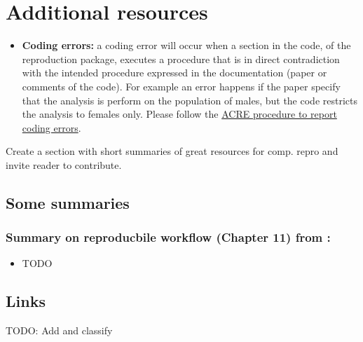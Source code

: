 \documentclass[]{book}
\providecommand{\tightlist}{%
  \setlength{\itemsep}{0pt}\setlength{\parskip}{0pt}}
\begin{document}
\hypertarget{additional-resources-1}{%
\chapter{Additional resources}\label{additional-resources-1}}

\begin{itemize}
\tightlist
\item
  \textbf{Coding errors:} a coding error will occur when a section in the code, of the reproduction package, executes a procedure that is in direct contradiction with the intended procedure expressed in the documentation (paper or comments of the code). For example an error happens if the paper specify that the analysis is perform on the population of males, but the code restricts the analysis to females only. Please follow the \href{ADD\%20LINK}{ACRE procedure to report coding errors}.
\end{itemize}

Create a section with short summaries of great resources for comp. repro and invite reader to contribute.

\hypertarget{some-summaries-1}{%
\section{Some summaries}\label{some-summaries-1}}

\hypertarget{summary-on-reproducbile-workflow-chapter-11-from-christensen2019transparent-1}{%
\subsection{\texorpdfstring{Summary on reproducbile workflow (Chapter 11) from \citet{christensen2019transparent}:}{Summary on reproducbile workflow (Chapter 11) from @christensen2019transparent:}}\label{summary-on-reproducbile-workflow-chapter-11-from-christensen2019transparent-1}}

\begin{itemize}
\tightlist
\item
  TODO
\end{itemize}

\hypertarget{links-1}{%
\section{Links}\label{links-1}}

TODO: Add and classify
\end{document}
